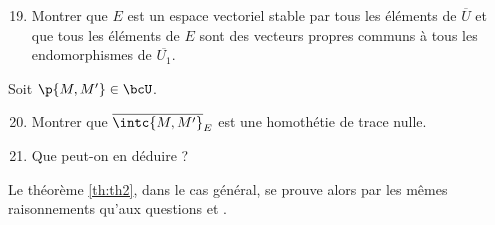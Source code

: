 \documentclass[a4paper,french,bookmarks]{article}
\begin{document}
    \begin{enumerate}
        \setcounter{enumi}{18}
        \item Montrer que $E$ est un espace vectoriel stable par tous les éléments de $\overline{U}$ et que tous les éléments de $E$ sont des vecteurs propres communs à tous les endomorphismes de $\overline{U_1}$.
        
    \end{enumerate}
    Soit $\p{M, M'} \in \bcU$.
    
    \begin{enumerate}
        \setcounter{enumi}{19}
        
        \item Montrer que $\overline{\intc{M, M'}}_E$ est une homothétie de trace nulle.
        
        \item Que peut-on en déduire ?
    \end{enumerate}
    
    Le théorème {\sffamily\ref{th:th2}}, dans le cas général, se prouve alors par les mêmes raisonnements qu'aux questions  et .
\end{document}
